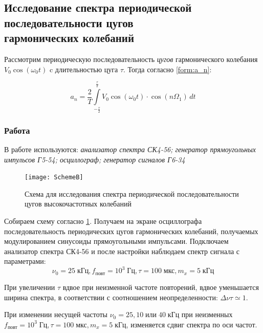 \documentclass[a4paper, 12pt]{article}
\begin{document}
\subsection*{Исследование спектра периодической последовательности цугов \\ гармонических колебаний}

Рассмотрим периодическую последовательность {\it{цугов}} гармонического колебания \\
$V_0 \cos (\omega_0 t)$ c длительностью цуга $\tau$.
Тогда согласно \ref{form:a_n}:

\begin{equation}
\label{form:cug_a_n}
a_n = \frac{2}{T}\int\limits_{ -\frac{\tau}{2} } ^ {\frac{\tau}{2} } V_0\cos(\omega_0t)\cdot \cos(n\Omega_1)\, dt
\end{equation}

\subsubsection*{Работа}

В работе используются: \textit{анализатор спектра СК4-56; генератор прямоугольных импульсов Г5-54; осциллограф; генератор сигналов Г6-34}

\begin{figure}[H]
\centering
\texttt{[image: SchemeB]}
\caption{Схема для исследования спектра периодической последовательности цугов высокочастотных колебаний}
\label{img:scheme B}
\end{figure}

Собираем схему согласно \ref{img:scheme B}. Получаем на экране осциллографа последовательность периодических цугов гармонических колебаний, получаемых модулированием синусоиды прямоугольными импульсами. Подключаем анализатор спектра СК4-56 и после настройки наблюдаем спектр сигнала с параметрами: $$ \nu_0 = 25 \; \text{кГц}, f_\text{повт} = 10^3 \; \text{Гц}, \tau = 100 \; \text{мкс}, m_x = 5 \; \text{кГц}$$

При увеличении $\tau$ вдвое при неизменной частоте повторений, вдвое уменьшается ширина спектра, в соответствии с соотношением неопределенности: $\Delta \nu \tau \simeq 1$.

При изменении несущей частоты  $\nu_0 = 25, 10 \; \text{или} \; 40\; \text{кГц}$ при неизменных $f_\text{повт} = 10^3 \; \text{Гц}, \tau = 100 \; \text{мкс}, m_x = 5 \; \text{кГц}$, изменяется сдвиг спектра по оси частот.
\end{document}
